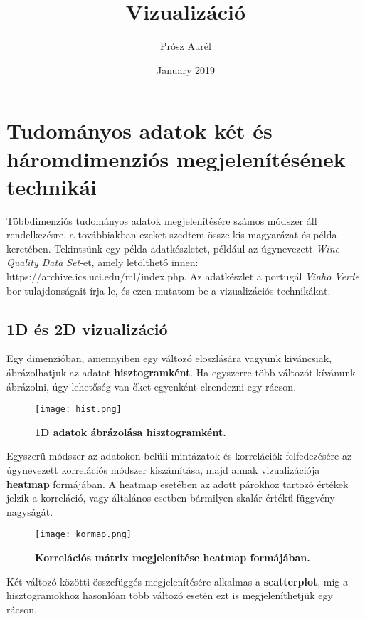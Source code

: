 \documentclass[12pt]{extarticle}
\title{Vizualizáció }
\author{Prósz Aurél}
\date{January 2019}
\begin{document}
\maketitle

\section{Tudományos adatok két és háromdimenziós megjelenítésének technikái}
Többdimenziós tudományos adatok megjelenítésére számos módszer áll rendelkezésre, a továbbiakban ezeket szedtem össze kis magyarázat és példa keretében. \newline
Tekintsünk egy példa adatkészletet, például az úgynevezett \textit{Wine Quality Data Set}-et, amely letölthető innen:  https://archive.ics.uci.edu/ml/index.php. Az adatkészlet a portugál \textit{Vinho Verde} bor tulajdonságait írja le, és ezen mutatom be a vizualizációs technikákat. 



    


\subsection{1D és 2D vizualizáció}
Egy dimenzióban, amennyiben egy változó eloszlására vagyunk kiváncsiak, ábrázolhatjuk az adatot \textbf{hisztogramként}. Ha egyszerre több változót kívánunk ábrázolni, úgy lehetőség van őket egyenként elrendezni egy rácson. 

\begin{figure}[H]
    \centering
    \texttt{[image: hist.png]}
    \caption{\textbf{1D adatok ábrázolása hisztogramként.}}
    \label{fig:GeneralDiagram}
 \end{figure}
 
 Egyszerű módszer az adatokon belüli mintázatok és korrelációk felfedezésére az úgynevezett korrelációs módszer kiszámítása, majd annak vizualizációja \textbf{heatmap} formájában. A heatmap esetében az adott párokhoz tartozó értékek jelzik a korreláció, vagy általános esetben bármilyen skalár értékű függvény nagyságát.
 
 \begin{figure}[H]
    \centering
    \texttt{[image: kormap.png]}
    \caption{\textbf{Korrelációs mátrix megjelenítése heatmap formájában.}}
    \label{fig:GeneralDiagram}
 \end{figure}
 
 Két változó közötti összefüggés megjelenítésére alkalmas a \textbf{scatterplot}, míg a hisztogramokhoz hasonlóan több változó esetén ezt is megjeleníthetjük egy rácson.
 
\end{document}

